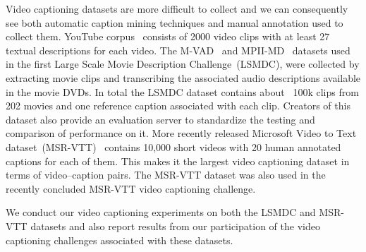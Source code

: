 Video captioning datasets are more difficult to collect and we can consequently
see both automatic caption mining techniques and manual annotation used to
collect them.
YouTube corpus~\cite{chen2011collecting} consists of 2000 video clips with
at least 27 textual descriptions for each video.
The M-VAD~\cite{AtorabiM-VAD2015} and MPII-MD~\cite{rohrbach15cvpr} datasets
used in the first Large Scale Movie Description Challenge~(LSMDC), were
collected by extracting movie clips and transcribing the associated audio
descriptions available in the movie DVDs.
In total the LSMDC dataset contains about ~100k clips from 202 movies and one
reference caption associated with each clip. 
Creators of this dataset also provide an evaluation server to standardize the
testing and comparison of performance on it.
More recently released Microsoft Video to Text
dataset~(MSR-VTT)~\cite{Xu:CVPR16} contains 10,000 short videos with 20 human
annotated captions for each of them. 
This makes it the largest video captioning dataset in terms of video--caption
pairs.
The MSR-VTT dataset was also used in the recently concluded MSR-VTT video captioning
challenge.

We conduct our video captioning experiments on both the LSMDC and MSR-VTT
datasets and also report results from our participation of the video captioning
challenges associated with these datasets. 

